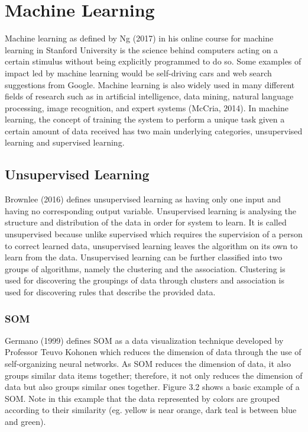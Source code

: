\section{Machine Learning}

Machine learning as defined by Ng (2017) in his online course for machine learning in Stanford University is the science behind computers acting on a certain stimulus without being explicitly programmed to do so. Some examples of impact led by machine learning would be self-driving cars and web search suggestions from Google. Machine learning is also widely used in many different fields of research such as in artificial intelligence, data mining, natural language processing, image recognition, and expert systems (McCria, 2014). In machine learning, the concept of training the system to perform a unique task given a certain amount of data received has two main underlying categories, unsupervised learning and supervised learning.

\subsection{Unsupervised Learning}

Brownlee (2016) defines unsupervised learning as having only one input and having no corresponding output variable. Unsupervised learning is analysing the structure and distribution of the data in order for system to learn. It is called unsupervised because unlike supervised  which requires the supervision of a person to correct learned data, unsupervised learning leaves the algorithm on its own to learn from the data. Unsupervised learning can be further classified into two groups of algorithms, namely the clustering and the association. Clustering is used for discovering the groupings of data through clusters and association is used for discovering rules that describe the provided data.

\subsubsection{SOM}
Germano (1999) defines SOM as a data visualization technique developed by Professor Teuvo Kohonen which reduces the dimension of data through the use of self-organizing neural networks. As SOM reduces the dimension of data, it also groups similar data items together; therefore, it not only reduces the dimension of data but also groups similar ones together. Figure 3.2 shows a basic example of a SOM. Note in this example that the data represented by colors are grouped according to their similarity (eg. yellow is near orange, dark teal is between blue and green).

